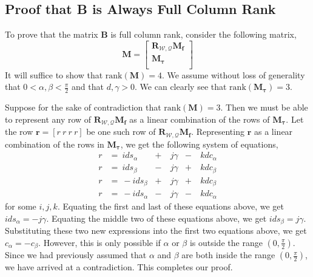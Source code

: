 \subsection{Proof that B is Always Full Column Rank}
\label{sec:ch2:rank}

To prove that the matrix $\mathbf{B}$ is full column rank, consider the following matrix,
%
\begin{equation}
\mathbf{M} = 
\begin{bmatrix}
\mathbf{R}_{\mathcal{W},\mathcal{Q}} \mathbf{M}_{\mathbf{f}} \\
\mathbf{M}_{\mathbf{\tau}}                                   \\
\end{bmatrix}
\end{equation}
%
It will suffice to show that $\mathrm{rank}(\mathbf{M})=4$.
We assume without loss of generality that $0 < \alpha,\beta < \frac{\pi}{2}$ and that $d,\gamma > 0$.
We can clearly see that $\mathrm{rank}(\mathbf{M}_{\mathbf{\tau}})=3$.

Suppose for the sake of contradiction that $\mathrm{rank}(\mathbf{M})=3$.
Then we must be able to represent any row of $\mathbf{R}_{\mathcal{W},\mathcal{Q}} \mathbf{M}_{\mathbf{f}}$ as a linear combination of the rows of $\mathbf{M}_{\mathbf{\tau}}$.
Let the row $\mathbf{r} =[r ~ r ~ r ~ r]$ be one such row of $\mathbf{R}_{\mathcal{W},\mathcal{Q}} \mathbf{M}_{\mathbf{f}}$.
Representing $\mathbf{r}$ as a linear combination of the rows in $\mathbf{M}_{\mathbf{\tau}}$, we get the following system of equations,
%
\begin{equation}
\begin{aligned}
r & = ~   i ds_{\alpha} & + & ~ j \gamma & - & ~ k dc_{\alpha} \\
r & = ~   i ds_{\beta}  & - & ~ j \gamma & + & ~ k dc_{\beta}  \\
r & = ~ - i ds_{\beta}  & + & ~ j \gamma & + & ~ k dc_{\beta}  \\
r & = ~ - i ds_{\alpha} & - & ~ j \gamma & - & ~ k dc_{\alpha}
\end{aligned}
\end{equation}
%
for some $i,j,k$.
Equating the first and last of these equations above, we get $i ds_{\alpha} = - j \gamma $.
Equating the middle two of these equations above, we get $i ds_{\beta} =  j \gamma $.
Substituting these two new expressions into the first two equations above, we get $c_{\alpha} = - c_{\beta}$.
However, this is only possible if $\alpha$ or $\beta$ is outside the range $(0,\frac{\pi}{2})$.
Since we had previously assumed that $\alpha$ and $\beta$ are both inside the range $(0,\frac{\pi}{2})$, we have arrived at a contradiction.
This completes our proof.



% 
% 

% 


